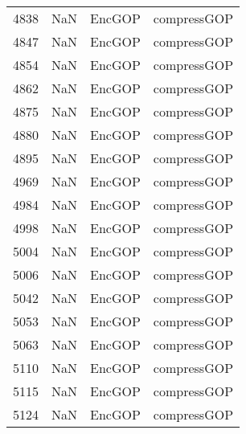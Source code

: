 \begin{tabular}{llll}
4838 &                   NaN &                     EncGOP &                               compressGOP \\
4847 &                   NaN &                     EncGOP &                               compressGOP \\
4854 &                   NaN &                     EncGOP &                               compressGOP \\
4862 &                   NaN &                     EncGOP &                               compressGOP \\
4875 &                   NaN &                     EncGOP &                               compressGOP \\
4880 &                   NaN &                     EncGOP &                               compressGOP \\
4895 &                   NaN &                     EncGOP &                               compressGOP \\
4969 &                   NaN &                     EncGOP &                               compressGOP \\
4984 &                   NaN &                     EncGOP &                               compressGOP \\
4998 &                   NaN &                     EncGOP &                               compressGOP \\
5004 &                   NaN &                     EncGOP &                               compressGOP \\
5006 &                   NaN &                     EncGOP &                               compressGOP \\
5042 &                   NaN &                     EncGOP &                               compressGOP \\
5053 &                   NaN &                     EncGOP &                               compressGOP \\
5063 &                   NaN &                     EncGOP &                               compressGOP \\
5110 &                   NaN &                     EncGOP &                               compressGOP \\
5115 &                   NaN &                     EncGOP &                               compressGOP \\
5124 &                   NaN &                     EncGOP &                               compressGOP \\

\end{tabular}
